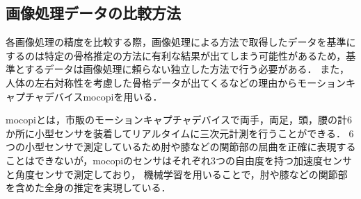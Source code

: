 \documentclass[titlepage]{jarticle}
\begin{document}

%
%
%

%
%
\subsection{画像処理データの比較方法}
%
各画像処理の精度を比較する際，画像処理による方法で取得したデータを基準にするのは特定の骨格推定の方法に有利な結果が出てしまう可能性があるため，基準とするデータは画像処理に頼らない独立した方法で行う必要がある．
また，人体の左右対称性を考慮した骨格データが出てくるなどの理由からモーションキャプチャデバイスmocopi\cite{mocopi}を用いる．


mocopiとは，市販のモーションキャプチャデバイスで両手，両足，頭，腰の計6か所に小型センサを装着してリアルタイムに三次元計測を行うことができる．
6つの小型センサで測定しているため肘や膝などの関節部の屈曲を正確に表現することはできないが，mocopiのセンサはそれぞれ3つの自由度を持つ加速度センサと角度センサで測定しており，
機械学習を用いることで，肘や膝などの関節部を含めた全身の推定を実現している．
\end{document}
